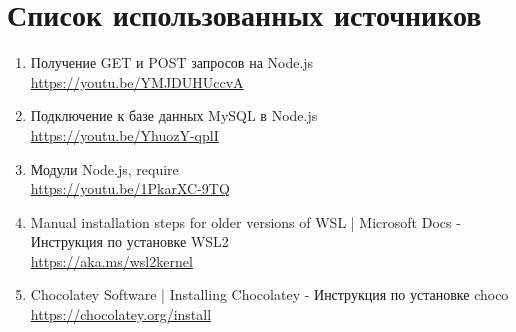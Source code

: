 \newpage

\section*{Список использованных источников}

\begin{enumerate}
    \item Получение GET и POST запросов на Node.js \\
    \url{https://youtu.be/YMJDUHUccvA}

    \item Подключение к базе данных MySQL в Node.js \\
    \url{https://youtu.be/YhuozY-qplI}

    \item Модули Node.js, require \\
    \url{https://youtu.be/1PkarXC-9TQ}

    \item Manual installation steps for older versions of WSL | Microsoft Docs - Инструкция по установке WSL2 \\
    \url{https://aka.ms/wsl2kernel}

    \item Chocolatey Software | Installing Chocolatey - Инструкция по установке choco \\
    \url{https://chocolatey.org/install}

\end{enumerate}
